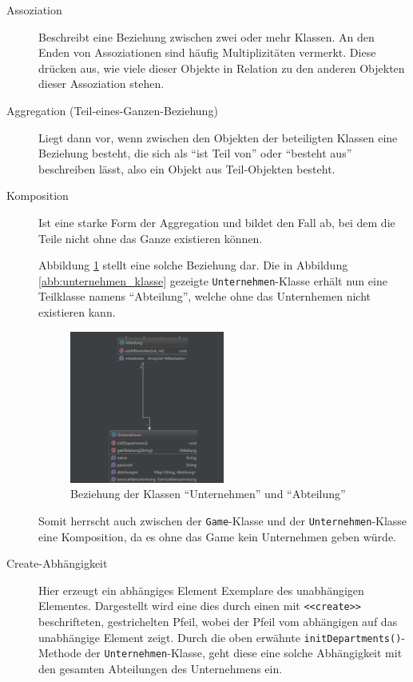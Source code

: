 \begin{description}
	\item[Assoziation]
	Beschreibt eine Beziehung zwischen zwei oder mehr Klassen. An den Enden von Assoziationen sind häufig Multiplizitäten vermerkt. Diese drücken aus, wie viele dieser Objekte in Relation zu den anderen Objekten dieser Assoziation stehen.
	\item[Aggregation (Teil-eines-Ganzen-Beziehung)]
	Liegt dann vor, wenn zwischen den Objekten der beteiligten Klassen eine Beziehung besteht,	die sich als \enquote{ist Teil von} oder \enquote{besteht aus} beschreiben lässt, also ein Objekt aus Teil-Objekten besteht.
	\item[Komposition]
	Ist eine starke Form der Aggregation und bildet den Fall ab, bei dem die Teile nicht ohne das Ganze existieren können. 
	
	Abbildung \ref{abb:unternehmen_abteilung_beziehung} stellt eine solche Beziehung dar. Die in Abbildung \ref{abb:unternehmen_klasse} gezeigte \texttt{Unternehmen}-Klasse erhält nun eine Teilklasse namens \enquote{Abteilung}, welche ohne das Unternhemen nicht existieren kann.
		\begin{figure}[h]
		\centering	\includegraphics[width=0.5\textwidth]{img/programmentwurf/unternehmen_abteilung_beziehung}
	\captionsetup{format=hang}
	\caption{
		\label{abb:unternehmen_abteilung_beziehung}Beziehung der Klassen \enquote{Unternehmen} und \enquote{Abteilung}}
	\end{figure}

	Somit herrscht auch zwischen der \texttt{Game}-Klasse und der \texttt{Unternehmen}-Klasse eine Komposition, da es ohne das Game kein Unternehmen geben würde.
	
	\item[Create-Abhängigkeit]
	Hier erzeugt ein abhängiges Element Exemplare des unabhängigen Elementes. 
	Dargestellt wird eine dies durch einen mit \texttt{<<create>>} beschrifteten, gestrichelten Pfeil, wobei der Pfeil vom abhängigen auf das unabhängige Element zeigt.
	Durch die oben erwähnte \texttt{initDepartments()}-Methode der \texttt{Unternehmen}-Klasse, geht diese eine solche Abhängigkeit mit den gesamten Abteilungen des Unternehmens ein.
		

\end{description}
